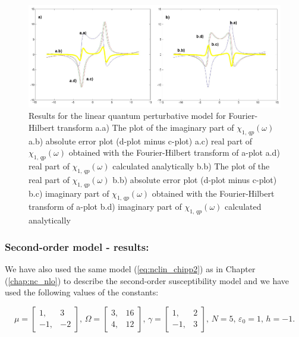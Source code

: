 \documentclass[12pt,twoside,a4paper]{article}
\numberwithin{equation}{subsection}
\numberwithin{figure}{subsection}
\begin{document}
\begin{figure}
  \includegraphics[width=150mm]{img/four_qp1.png}
  \caption{Results for the linear quantum perturbative model for Fourier-Hilbert transform
    a.a) The plot of the imaginary part of ${\chi_{1, \, qp}}(\omega )$
    a.b) absolute error plot (d-plot minus c-plot) 
    a.c) real part of ${\chi_{1, \, qp}}(\omega )$ obtained with the Fourier-Hilbert transform of a-plot 
    a.d) real part of ${\chi_{1, \, qp}}(\omega )$ calculated analytically 
    b.b) The plot of the real part of ${\chi_{1, \, qp}}(\omega )$ 
    b.b) absolute error plot (d-plot minus c-plot) 
    b.c) imaginary part of ${\chi_{1, \, qp}}(\omega )$ obtained with the Fourier-Hilbert transform of a-plot 
    b.d) imaginary part of ${\chi_{1, \, qp}}(\omega )$ calculated analytically  
    \label{fig:four_qp1}
  }
\end{figure}

\subsubsection*{Second-order model - results:}

We have also used the same model (\ref{eq:nclin_chipp2}) as in Chapter (\ref{chap:nc_nlo}) to describe the second-order susceptibility model and we have used the following values of the constants: 

\begin{equation}
	\mu = \begin{bmatrix} 
    	1,  & 3 \\ 
    	-1, & -2 
  	\end{bmatrix} , \, 
  	\Omega =  \begin{bmatrix}  
    	3, & 16 \\ 
    	4, & 12 
  	\end{bmatrix} , \,
  	\gamma =  \begin{bmatrix}  
  		1,  & 2 \\ 
  		-1, & 3
  	\end{bmatrix} , \, 
  	N = 5 , \, 
  	\varepsilon_0 = 1, \,
  	h = - 1 .
\end{equation}
\end{document}
